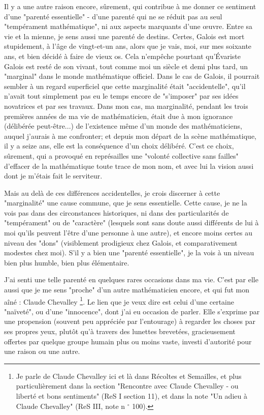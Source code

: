 Il y a une autre raison encore, sûrement, qui contribue à me donner ce sentiment d'une "parenté essentielle" - d'une parenté qui ne se réduit pas au seul "tempérament mathématique", ni aux aspects marquants d'une œuvre. Entre sa vie et la mienne, je sens aussi une parenté de destins. Certes, Galois est mort stupidement, à l'âge de vingt-et-un ans, alors que je vais, moi, sur mes soixante ans, et bien décidé à faire de vieux os. Cela n'empêche pourtant qu'Évariste Galois est resté de son vivant, tout comme moi un siècle et demi plus tard, un "marginal" dans le monde mathématique officiel. Dans le cas de Galois, il pourrait sembler à un regard superficiel que cette marginalité était "accidentelle", qu'il n'avait tout simplement pas eu le temps encore de "s'imposer" par ses idées novatrices et par ses travaux. Dans mon cas, ma marginalité, pendant les trois premières années de ma vie de mathématicien, était due à mon ignorance (délibérée peut-être...) de l'existence même d'un monde des mathématiciens, auquel j'aurais à me confronter; et depuis mon départ de la scène mathématique, il y a seize ans, elle est la conséquence d'un choix délibéré. C'est ce choix, sûrement, qui a provoqué en représailles une "volonté collective sans failles" d'effacer de la mathématique toute trace de mon nom, et avec lui la vision aussi dont je m'étais fait le serviteur.

Mais au delà de ces différences accidentelles, je crois discerner à cette "marginalité" une cause commune, que je sens essentielle. Cette cause, je ne la vois pas dans des circonstances historiques, ni dans des particularités de "tempérament" ou de "caractère" (lesquels sont sans doute aussi différents de lui à moi qu'ils peuvent l'être d'une personne à une autre), et encore moins certes au niveau des "dons" (visiblement prodigieux chez Galois, et comparativement modestes chez moi). S'il y a bien une "parenté essentielle", je la vois à un niveau bien plus humble, bien plus élémentaire.

J'ai senti une telle parenté en quelques rares occasions dans ma vie. C'est par elle aussi que je me sens "proche" d'un autre mathématicien encore, et qui fut mon aîné : Claude Chevalley \footnote{Je parle de Claude Chevalley ici et là dans Récoltes et Semailles, et plus particulièrement dans la section "Rencontre avec Claude Chevalley - ou liberté et bons sentiments" (ReS I section 11), et dans la note "Un adieu à Claude Chevalley" (ReS III, note n ${ }^{\circ}$ 100).}. Le lien que je veux dire est celui d'une certaine "naïveté", ou d'une "innocence", dont j'ai eu occasion de parler. Elle s'exprime par une propension (souvent peu appréciée par l'entourage) à regarder les choses par ses propres yeux, plutôt qu'à travers des lunettes brevetées, gracieusement offertes par quelque groupe humain plus ou moins vaste, investi d'autorité pour une raison ou une autre.

